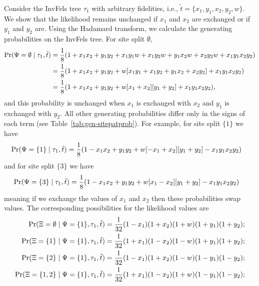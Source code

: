 Consider the InvFels tree $\tau_1$ with arbitrary fidelities, i.e., $\tilde{t}=\{x_1,y_1,x_2,y_2,w\}$.
We show that the likelihood remains unchanged if $x_1$ and $x_2$ are exchanged or if $y_1$ and $y_2$ are.
Using the Hadamard transform, we calculate the generating probabilities on the InvFels tree.
For site split $\emptyset$,
\begin{align*}
    \Pr(\Psi=\emptyset\mid \tau_1, \tilde{t}) & = \frac{1}{8} (1 + x_1x_2 +  y_1y_2 +  x_1y_1w + x_1y_2w + y_1x_2w + x_2y_2w + x_1y_1x_2y_2) \\
                                              & = \frac{1}{8} (1 + x_1x_2 +  y_1y_2 +  w[x_1y_1 + x_1y_2 + y_1x_2 + x_2y_2] + x_1y_1x_2y_2) \\
                                              & = \frac{1}{8} (1 + x_1x_2 +  y_1y_2 +  w[x_1 + x_2][y_1 + y_2] + x_1y_1x_2y_2),
\end{align*}
and this probability is unchanged when $x_1$ is exchanged with $x_2$ and $y_1$ is exchanged with $y_2$.
All other generating probabilities differ only in the signs of each term (see Table~\ref{tab:gen-sitepatprob}).
For example, for site split $\{1\}$ we have
\begin{align*}
    \Pr(\Psi=\{1\}\mid \tau_1, \tilde{t}) & = \frac{1}{8} (1 - x_1x_2 +  y_1y_2 +  w[-x_1 + x_2][y_1 + y_2] - x_1y_1x_2y_2)
\end{align*}
and for site split $\{3\}$ we have
\begin{align*}
    \Pr(\Psi=\{3\}\mid \tau_1, \tilde{t}) & = \frac{1}{8} (1 - x_1x_2 +  y_1y_2 +  w[x_1 - x_2][y_1 + y_2] - x_1y_1x_2y_2)
\end{align*}
meaning if we exchange the values of $x_1$ and $x_2$ then these probabilities swap values.
The corresponding possibilities for the likelihood values are
\begin{align*}
    \Pr(\Xi=\emptyset \mid \Psi=\{1\}, \tau_1, \tilde{t}) &= \frac{1}{32}(1-x_1)(1+x_2)(1+w)(1+y_1)(1+y_2); \\
    \Pr(\Xi=\{1\} \mid \Psi=\{1\}, \tau_1, \tilde{t}) &= \frac{1}{32}(1+x_1)(1-x_2)(1-w)(1+y_1)(1+y_2); \\
    \Pr(\Xi=\{2\} \mid \Psi=\{1\}, \tau_1, \tilde{t}) &= \frac{1}{32}(1-x_1)(1+x_2)(1-w)(1-y_1)(1-y_2); \\
    \Pr(\Xi=\{1,2\} \mid \Psi=\{1\}, \tau_1, \tilde{t}) &= \frac{1}{32}(1+x_1)(1-x_2)(1+w)(1-y_1)(1-y_2);
\end{align*}
